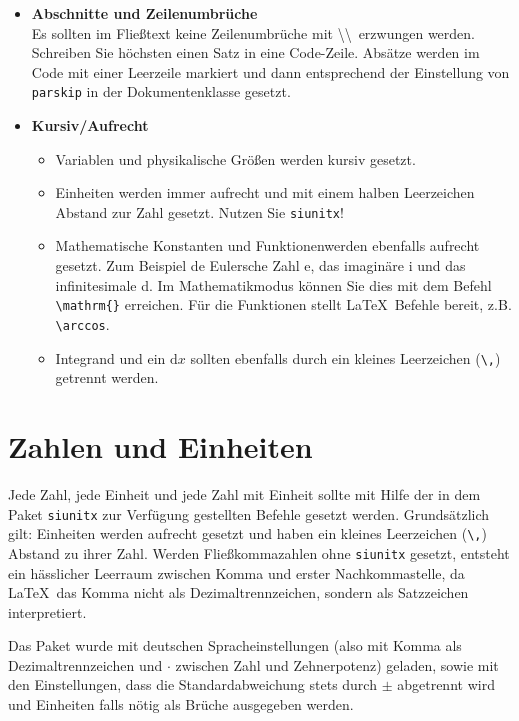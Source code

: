 \begin{itemize}
    \item \textbf{Abschnitte und Zeilenumbrüche} \\
        Es sollten im Fließtext keine Zeilenumbrüche mit \textbackslash\textbackslash \ erzwungen werden.
        Schreiben Sie höchsten einen Satz in eine Code-Zeile.
        Absätze werden im Code mit einer Leerzeile markiert und dann entsprechend der Einstellung von \texttt{parskip} in der Dokumentenklasse gesetzt.
    \item \textbf{Kursiv/Aufrecht} \\
        \begin{itemize}
            \item Variablen und physikalische Größen werden kursiv gesetzt. 
            \item Einheiten werden immer aufrecht und mit einem halben Leerzeichen Abstand zur Zahl gesetzt. Nutzen Sie \texttt{siunitx}!
            \item Mathematische Konstanten und Funktionenwerden ebenfalls aufrecht gesetzt. Zum Beispiel de Eulersche Zahl e, das imaginäre i und das infinitesimale d.
                Im Mathematikmodus können Sie dies mit dem Befehl \verb_\mathrm{}_ erreichen. Für die Funktionen stellt \LaTeX \ Befehle bereit, z.B. \verb+\arccos+.
            \item Integrand und ein $\mathrm{d}x$ sollten ebenfalls durch ein kleines Leerzeichen (\verb+\,+) getrennt werden.
        \end{itemize}
        


\end{itemize}

\section{Zahlen und Einheiten}

Jede Zahl, jede Einheit und jede Zahl mit Einheit sollte mit Hilfe der in dem Paket \texttt{siunitx} zur Verfügung gestellten Befehle gesetzt werden.
Grundsätzlich gilt: Einheiten werden aufrecht gesetzt und haben ein kleines Leerzeichen (\verb+\,+) Abstand zu ihrer Zahl. 
Werden Fließkommazahlen ohne \texttt{siunitx} gesetzt, entsteht ein hässlicher Leerraum zwischen Komma und erster Nachkommastelle, da \LaTeX \ das Komma nicht als Dezimaltrennzeichen, sondern als Satzzeichen interpretiert.

Das Paket wurde mit deutschen Spracheinstellungen (also mit Komma als Dezimaltrennzeichen und $\cdot$ zwischen Zahl und Zehnerpotenz) geladen, sowie mit den Einstellungen, dass die Standardabweichung stets durch $\pm$ abgetrennt wird und Einheiten falls nötig als Brüche ausgegeben werden.

